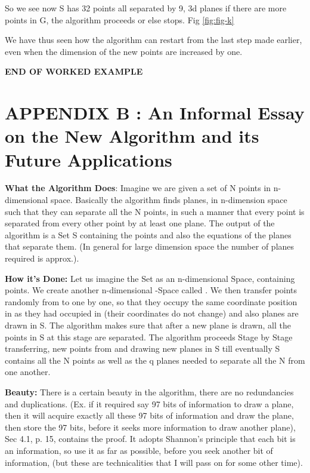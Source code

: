\documentclass[english]{article}
\begin{document}
 So we see now S has 32 points all separated by 9, 3d planes if there are more points in G, the algorithm proceeds or else stops. Fig \ref{fig:fig-k}

We have thus seen how the algorithm can restart from the last step made earlier, even when the dimension of the new points are increased by one.



\textbf{END OF WORKED EXAMPLE}


\section{APPENDIX  B : An Informal Essay on the New Algorithm and its Future Applications}


\textbf{\large What the Algorithm Does}: Imagine we are given a set
 of N points in n-dimensional space. Basically the algorithm finds
planes, in n-dimension space such that they can separate all the N
points, in such a manner that every point is separated from every
other point by at least one plane. The output of the algorithm is
a Set S containing the points and also the equations of the planes
that separate them. (In general for large dimension space the number
of planes required is approx.).

\medskip{}


\textbf{\large How it\textquoteright{}s Done:} Let us imagine the
Set  as an n-dimensional Space, containing  points. We
create another n-dimensional -Space called . We then transfer
points randomly from  to  one by one, so that they occupy
the same coordinate position in  as they had occupied in 
(their coordinates do not change) and also planes are drawn in S.
The algorithm makes sure that after a new plane is drawn, all the
points in S at this stage are separated. The algorithm proceeds Stage
by Stage transferring, new points from  and drawing new planes
in S till eventually S contains all the N points as well as the q
planes needed to separate all the N from one another. 

\medskip{}


\textbf{\large Beauty: }There is a certain beauty in the algorithm,
there are no redundancies and duplications. (Ex. if it required say
97 bits of information to draw a plane, then it will acquire exactly
all these 97 bits of information and draw the plane, then store the
97 bits, before it seeks more information to draw another plane),
Sec 4.1, p. 15, contains the proof. It adopts Shannon\textquoteright{}s
principle that each bit is an information, so use it as far as possible,
before you seek another bit of information, (but these are technicalities
that I will pass on for some other time).
\end{document}

